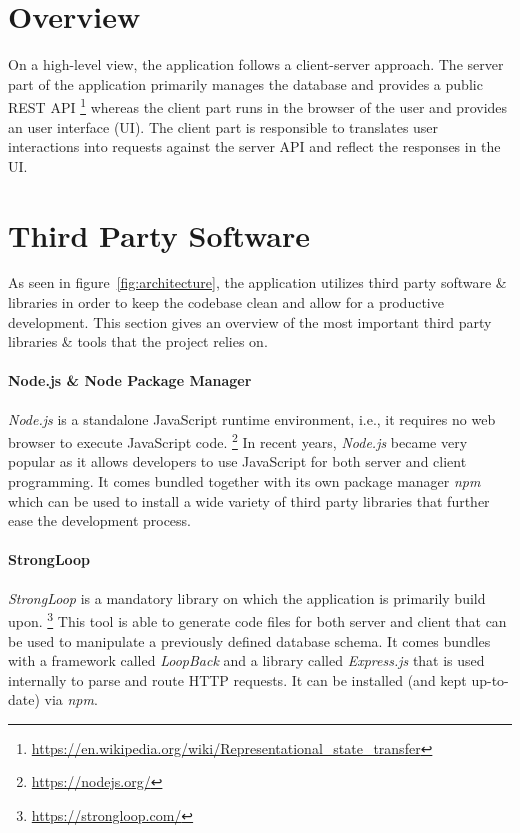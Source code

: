 \documentclass[nochapterpage,nopartpage,noheadingspace,numbersubsubsec,bigchapter,colorback,accentcolor=tud9c,10pt]{tudreport}
\begin{document}
  \section{Overview}
  \label{sec:tech:architecture:overview}
    On a high-level view, the application follows a client-server approach. The server part of the application primarily manages the database and provides a public REST API%
    \footnote{\url{https://en.wikipedia.org/wiki/Representational_state_transfer}}
    whereas the client part runs in the browser of the user and provides an user interface (UI). The client part is responsible to translates user interactions into requests against the server API and reflect the responses in the UI.

  \section{Third Party Software}
  \label{sec:tech:architecture:3rd-party}

    As seen in figure~\ref{fig:architecture}, the application utilizes third party software \& libraries in order to keep the codebase clean and allow for a productive development. This section gives an overview of the most important third party libraries \& tools that the project relies on.

  \paragraph{Node.js \& Node Package Manager}
    \emph{Node.js} is a standalone JavaScript runtime environment, i.e., it requires no web browser to execute JavaScript code.%
    \footnote{\url{https://nodejs.org/}}
    In recent years, \emph{Node.js} became very popular as it allows developers to use JavaScript for both server and client programming. It comes bundled together with its own package manager \emph{npm} which can be used to install a wide variety of third party libraries that further ease the development process.

  \paragraph{StrongLoop}
    \emph{StrongLoop} is a mandatory library on which the application is primarily build upon.%
    \footnote{\url{https://strongloop.com/}}
    This tool is able to generate code files for both server and client that can be used to manipulate a previously defined database schema. It comes bundles with a framework called \emph{LoopBack} and a library called \emph{Express.js} that is used internally to parse and route HTTP requests. It can be installed (and kept up-to-date) via \emph{npm}.
\end{document}
